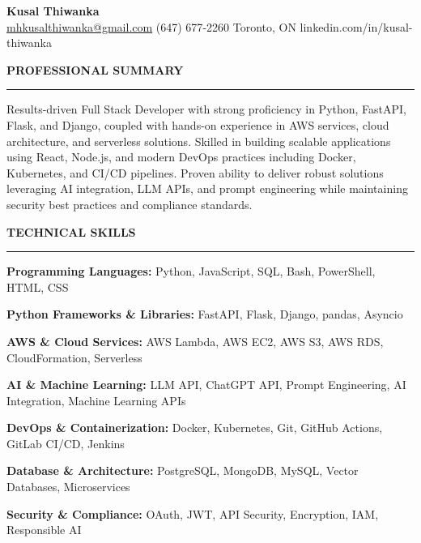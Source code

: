 \documentclass[10pt,letterpaper]{article}
\begin{document}
\begin{center}
{\LARGE\textbf{Kusal Thiwanka}}\\[3pt]
\href{mailto:mhkusalthiwanka@gmail.com}{mhkusalthiwanka@gmail.com}\hspace{2em}%
(647) 677{-}2260\hspace{2em}%
Toronto, ON\hspace{2em}
linkedin.com/in/kusal-thiwanka
\end{center}

\vspace{6pt}

\textbf{PROFESSIONAL SUMMARY}\\[-8pt]
\noindent\rule{\textwidth}{1pt}

\vspace{-2pt}

Results-driven Full Stack Developer with strong proficiency in Python, FastAPI, Flask, and Django, coupled with hands-on experience in AWS services, cloud architecture, and serverless solutions. Skilled in building scalable applications using React, Node.js, and modern DevOps practices including Docker, Kubernetes, and CI/CD pipelines. Proven ability to deliver robust solutions leveraging AI integration, LLM APIs, and prompt engineering while maintaining security best practices and compliance standards.

\vspace{8pt}

\textbf{TECHNICAL SKILLS}\\[-8pt]
\noindent\rule{\textwidth}{1pt}

\vspace{-2pt}

\textbf{Programming Languages:} Python, JavaScript, SQL, Bash, PowerShell, HTML, CSS

\textbf{Python Frameworks \& Libraries:} FastAPI, Flask, Django, pandas, Asyncio

\textbf{AWS \& Cloud Services:} AWS Lambda, AWS EC2, AWS S3, AWS RDS, CloudFormation, Serverless

\textbf{AI \& Machine Learning:} LLM API, ChatGPT API, Prompt Engineering, AI Integration, Machine Learning APIs

\textbf{DevOps \& Containerization:} Docker, Kubernetes, Git, GitHub Actions, GitLab CI/CD, Jenkins

\textbf{Database \& Architecture:} PostgreSQL, MongoDB, MySQL, Vector Databases, Microservices

\textbf{Security \& Compliance:} OAuth, JWT, API Security, Encryption, IAM, Responsible AI
\end{document}

